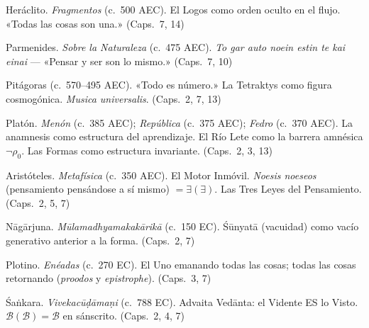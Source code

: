 \documentclass[10pt, openany, oneside]{book}
\renewcommand{\footnotesize}{\fontsize{8.5}{11}\selectfont}
\begin{document}
\vspace{1em}

{\footnotesize

\noindent Heráclito. \textit{Fragmentos} (c.\ 500 AEC). El Logos como orden oculto en el flujo. «Todas las cosas son una.» (Caps.\ 7, 14)

\vspace{0.3em}

\noindent Parmenides. \textit{Sobre la Naturaleza} (c.\ 475 AEC). \textit{To gar auto noein estin te kai einai} --- «Pensar y ser son lo mismo.» (Caps.\ 7, 10)

\vspace{0.3em}

\noindent Pitágoras (c.\ 570--495 AEC). «Todo es número.» La Tetraktys como figura cosmogónica. \textit{Musica universalis}. (Caps.\ 2, 7, 13)

\vspace{0.3em}

\noindent Platón. \textit{Menón} (c.\ 385 AEC); \textit{República} (c.\ 375 AEC); \textit{Fedro} (c.\ 370 AEC). La anamnesis como estructura del aprendizaje. El Río Lete como la barrera amnésica $\neg\rho_0$. Las Formas como estructura invariante. (Caps.\ 2, 3, 13)

\vspace{0.3em}

\noindent Aristóteles. \textit{Metafísica} (c.\ 350 AEC). El Motor Inmóvil. \textit{Noesis noeseos} (pensamiento pensándose a sí mismo) $= \exists(\exists)$. Las Tres Leyes del Pensamiento. (Caps.\ 2, 5, 7)

\vspace{0.3em}

\noindent N\={a}g\={a}rjuna. \textit{M\={u}lamadhyamakak\={a}rik\={a}} (c.\ 150 EC). \'{S}\={u}nyat\={a} (vacuidad) como vacío generativo anterior a la forma. (Caps.\ 2, 7)

\vspace{0.3em}

\noindent Plotino. \textit{Enéadas} (c.\ 270 EC). El Uno emanando todas las cosas; todas las cosas retornando (\textit{proodos} y \textit{epistrophe}). (Caps.\ 3, 7)

\vspace{0.3em}

\noindent \'{S}a\.{n}kara. \textit{Vivekac\={u}\d{d}\={a}ma\d{n}i} (c.\ 788 EC). Advaita Ved\={a}nta: el Vidente ES lo Visto. $\mathcal{B}(\mathcal{B}) = \mathcal{B}$ en sánscrito. (Caps.\ 2, 4, 7)

}
\end{document}
